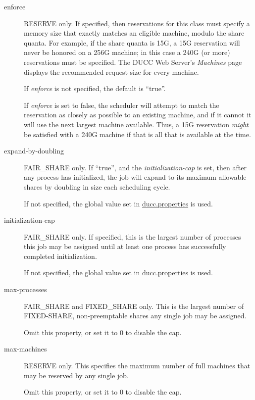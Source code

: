 \begin{description}
      \item[enforce] RESERVE only.  If specified, then reservations for this class must specify a
        memory size that exactly matches an eligible machine, modulo the share quanta.  For example,
        if the share quanta is 15G, a 15G reservation will never be honored on a 256G machine; in this
        case a 240G (or more) reservations must be specified.  The DUCC Web Server's {\em Machines} page
        displays the recommended request size for every machine.  

        If {\em enforce} is not specified, the default is ``true''.

        If {\em enforce} is set to false, the scheduler will attempt to match the reservation as 
        closely as possible to an existing machine, and if it cannot it will use the next largest
        machine available.  Thus, a 15G reservation {\em might} be satisfied with a 240G machine if
        that is all that is available at the time.

      \item[expand-by-doubling] FAIR\_SHARE only.  If ``true'', and the {\em initialization-cap} is
        set, then after any process has initialized, the job will expand to its maximum allowable
        shares by doubling in size each scheduling cycle.  

        If not specified, the global value set in \hyperref[sec:ducc.properties]{ducc.properties} is used.

      \item[initialization-cap] FAIR\_SHARE only. If specified, this is the largest number of processes this job
        may be assigned until at least one process has successfully completed initialization.

        If not specified, the global value set in \hyperref[sec:ducc.properties]{ducc.properties} is used.

      \item[max-processes] FAIR\_SHARE and FIXED\_SHARE only.  This is the largest number of FIXED-SHARE,
        non-preemptable shares any single job may be assigned.

        Omit this property, or set it to 0 to disable the cap.

      \item[max-machines] RESERVE only.  This specifies the maximum number of full machines that
        may be reserved by any single job.

        Omit this property, or set it to 0 to disable the cap.


\end{description}
